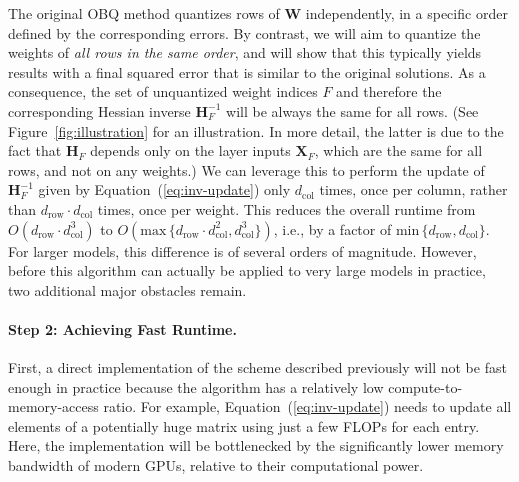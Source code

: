 The original OBQ method quantizes rows of $\mathbf{W}$ independently, in a specific order defined by the corresponding errors. 
By contrast, we will aim to quantize the weights of \emph{all rows in the same order}, and will show that this typically yields results with a final squared error that is similar to the original solutions. As a consequence, the set of unquantized weight indices $F$ and therefore the corresponding Hessian inverse $\mathbf{H}_F^{-1}$ will be always the same for all rows. 
(See Figure~\ref{fig:illustration} for an illustration. In more detail, the latter is due to the fact that $\mathbf{H}_F$ depends only on the layer inputs $\mathbf{X}_F$, which are the same for all rows, and not on any weights.) We can leverage this to perform the update of $\mathbf{H}_F^{-1}$ given by Equation~(\ref{eq:inv-update}) only $d_\text{col}$ times, once per column, rather than $d_\text{row} \cdot d_\text{col}$ times, once per weight. This reduces the overall runtime from $O(d_\text{row} \cdot d_\text{col}^3)$ to $O(\text{max} \, \{d_\text{row} \cdot d_\text{col}^2, d_\text{col}^3\})$, i.e., by a factor of $\text{min} \, \{d_\text{row}, d_\text{col}\}$. 
For larger models, this difference is of several orders of magnitude. 
However, before this algorithm can actually be applied to very large models in practice, two additional major obstacles remain. 

\paragraph{Step 2: Achieving Fast Runtime.}
First, a direct implementation of the scheme described previously will not be fast enough in practice because the algorithm has a relatively low compute-to-memory-access ratio. For example, Equation~(\ref{eq:inv-update}) needs to update all elements of a potentially huge matrix using just a few FLOPs for each entry. Here, the implementation will be bottlenecked by the significantly lower memory bandwidth of modern GPUs, relative to their computational power.

